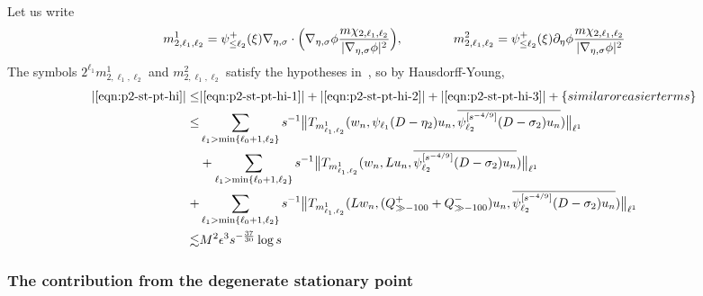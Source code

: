 \documentclass[letterpaper, reqno,final]{amsart}
\newcommand{\deles}{\nabla_{\eta,\sigma}}
\newcommand{\btext}[1]{\left\{\textup{#1}\right\}}
\newcommand{\bsime}{\btext{similar or easier terms}}
\begin{document}
Let us write
\begin{equation*}\begin{split}
    m^1_{2,\ell_1,\ell_2} = \psi^+_{\leq \ell_2}(\xi) \deles \cdot \Bigl(\deles \phi \frac{m \chi_{2,\ell_1,\ell_2}}{|\deles \phi|^2}\Bigr), \qquad\qquad
    m^2_{2,\ell_1, \ell_2} = \psi^+_{\leq \ell_2}(\xi) \partial_\eta \phi \frac{m \chi_{2,\ell_1,\ell_2}}{|\deles \phi|^2}
\end{split}\end{equation*}
The symbols $2^{\ell_1} m^1_{2,\ell_1,\ell_2}$ and $m^2_{2,\ell_1, \ell_2}$ satisfy the hypotheses in~, so by Hausdorff-Young,
\begin{equation*}\begin{split}
    |\eqref{eqn:p2-st-pt-hi}| \leq& |\eqref{eqn:p2-st-pt-hi-1}| + |\eqref{eqn:p2-st-pt-hi-2}| + |\eqref{eqn:p2-st-pt-hi-3}| + \bsime\\
    \leq& \sum_{\substack{\ell_1 > \min\{\ell_0+1, \ell_2\}}} s^{-1}\bigl\lVert T_{m^1_{\ell_1,\ell_2}}(w_n, \psi_{\ell_1}(D - \eta_2) u_n,\overline{\psi_{\ell_2}^{[s^{-4/9}]}(D - \sigma_2)u_n})\bigr\rVert_{\ell^1}\\
    &+ \sum_{\substack{\ell_1 > \min\{\ell_0+1, \ell_2\}}} s^{-1}\bigl\lVert T_{m^1_{\ell_1,\ell_2}}(w_n, L u_n,\overline{\psi_{\ell_2}^{[s^{-4/9}]}(D - \sigma_2)u_n})\bigr\rVert_{\ell^1}\\
    +& \sum_{\substack{\ell_1 > \min\{\ell_0+1, \ell_2\}}} s^{-1}\bigl\lVert T_{m^1_{\ell_1,\ell_2}}(Lw_n, (Q^{+}_{\gg - 100} + Q^-_{\gg -100}) u_n,\overline{\psi_{\ell_2}^{[s^{-4/9}]}(D - \sigma_2)u_n})\bigr\rVert_{\ell^1}\\
    \lesssim& M^2\epsilon^3 s^{-\frac{37}{30}}\log s
\end{split}\end{equation*}

\subsubsection{The contribution from the degenerate stationary point}
\end{document}
